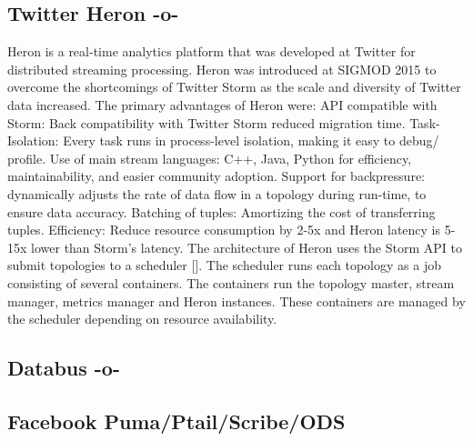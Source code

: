 \subsection{Twitter Heron -o-}

Heron is a real-time analytics platform that was developed at Twitter
for distributed streaming processing. Heron was introduced at SIGMOD
2015 to overcome the shortcomings of Twitter Storm as the scale and
diversity of Twitter data increased.  The primary advantages of Heron
were: API compatible with Storm: Back compatibility with Twitter Storm
reduced migration time\cite{www-TwitterHeronOpen}.  Task-Isolation:
Every task runs in process-level isolation, making it easy to debug/
profile. Use of main stream languages: C++, Java, Python for
efficiency, maintainability, and easier community adoption. Support
for backpressure: dynamically adjusts the rate of data flow in a
topology during run-time, to ensure data accuracy. Batching of tuples:
Amortizing the cost of transferring tuples. Efficiency: Reduce
resource consumption by 2-5x and Heron latency is 5-15x lower than
Storm's latency. The architecture of Heron uses the Storm API to
submit topologies to a scheduler [\cite{www-TwitterHeron}].  The
scheduler runs each topology as a job consisting of several
containers. The containers run the topology master, stream manager,
metrics manager and Heron instances. These containers are managed by
the scheduler depending on resource availability.



\subsection{Databus -o-}



\subsection{Facebook Puma/Ptail/Scribe/ODS}
     
